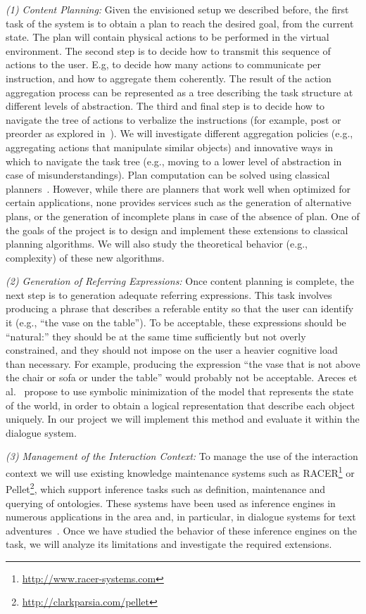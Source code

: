 \emph{(1) Content Planning:} Given the envisioned setup we described before,
the first task of the system is to obtain a plan to reach the desired goal, from the current state.
The plan will contain physical actions to be performed in the virtual environment. The second
step is to decide how to transmit this sequence of actions to the user. E.g, to decide
how many actions to communicate per instruction, and how to aggregate them
coherently. The result of the action aggregation process can be represented as a
tree describing the task structure at different levels of abstraction. The third
and final step is to decide how to navigate the tree of actions to verbalize the
instructions (for example, post or preorder as
explored in~\cite{foster-etal-ijcai2009}). We will investigate
different aggregation policies (e.g., aggregating actions that
manipulate similar objects) and innovative ways in which to navigate the task tree
(e.g., moving to a lower level of abstraction in case of misunderstandings).
Plan computation can be solved using classical planners~\cite{kautz99,hoffmann01,nau04}.
However, while there are planners that work well when optimized for certain
applications, none provides services such as the generation of alternative
plans, or the generation of incomplete plans in case of the absence of plan.
One of the goals of the project is to design and implement these extensions to 
classical planning algorithms. We will also study the theoretical behavior (e.g., complexity) of
these new algorithms. 

\emph{(2) Generation of Referring Expressions:} Once content planning is
complete, the next step is to generation adequate referring expressions. 
This task involves producing a phrase that describes a referable entity so that the user can
identify it (e.g., ``the vase on the table''). To be
acceptable, these expressions should be ``natural:'' they should be at the same time
sufficiently but not overly constrained, and they should not impose on the user a heavier 
cognitive load than necessary. For example, producing the expression 
``the vase that is not above the chair or sofa or under the
table'' would probably not be acceptable. Areces et al.~ propose to
use symbolic minimization of the model that represents the state of the world, in
order to obtain a logical representation that describe each object uniquely. In our
project we will implement this method and evaluate it within the dialogue system.

\emph{(3) Management of the Interaction Context:} To manage the use of
the interaction context we will use existing knowledge maintenance systems such as
RACER\footnote{\url{http://www.racer-systems.com}} or Pellet\footnote{\url{http://clarkparsia.com/pellet}}, which support inference tasks such as
definition, maintenance and querying of ontologies. These systems have been used
as inference engines in numerous applications in
the area and, in particular, in dialogue systems for text adventures~\cite{benotti09b}. Once we
have studied the behavior of these inference engines on the task, we will
analyze its limitations and investigate the required extensions.

